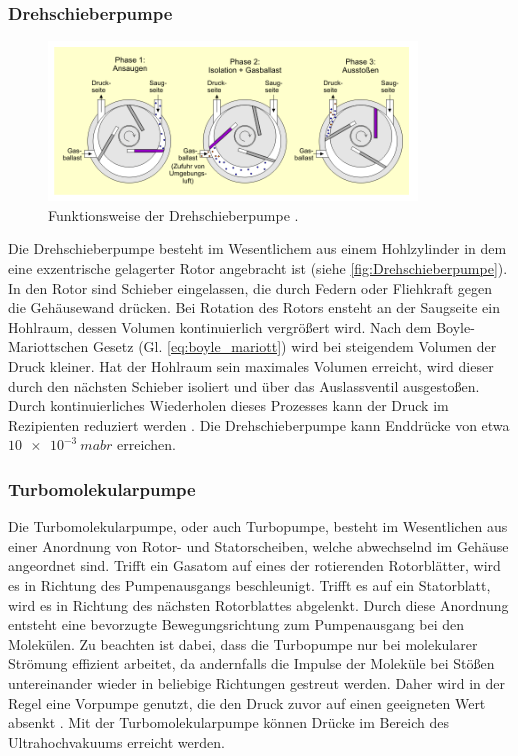 \subsubsection{Drehschieberpumpe}
\begin{figure}
    \centering
    \includegraphics{content/DP.PNG}
    \caption{Funktionsweise der Drehschieberpumpe \cite{V070_glossar}.}
    \label{fig:Drehschieberpumpe}
  \end{figure}
Die Drehschieberpumpe besteht im Wesentlichem aus einem Hohlzylinder in dem eine exzentrische gelagerter Rotor angebracht ist (siehe \autoref{fig:Drehschieberpumpe}).
In den Rotor sind Schieber eingelassen, die durch Federn oder Fliehkraft gegen die Gehäusewand drücken. Bei Rotation des Rotors ensteht an der Saugseite ein Hohlraum, dessen Volumen
kontinuierlich vergrößert wird. Nach dem Boyle-Mariottschen Gesetz (Gl. \eqref{eq:boyle_mariott}) wird bei steigendem Volumen der Druck kleiner. Hat der Hohlraum sein maximales
Volumen erreicht, wird dieser durch den nächsten Schieber isoliert und über das Auslassventil ausgestoßen. Durch kontinuierliches Wiederholen dieses Prozesses kann der Druck im
Rezipienten reduziert werden \cite{V070_glossar}. Die Drehschieberpumpe kann Enddrücke von etwa $\SI{10e-3}{mabr}$ erreichen.\cite{cern_vacuum}
\subsubsection{Turbomolekularpumpe}
Die Turbomolekularpumpe, oder auch Turbopumpe, besteht im Wesentlichen aus einer Anordnung von Rotor- und Statorscheiben, welche abwechselnd im Gehäuse angeordnet sind.
Trifft ein Gasatom auf eines der rotierenden Rotorblätter, wird es in Richtung des Pumpenausgangs beschleunigt. Trifft es auf ein Statorblatt, wird es in Richtung des nächsten Rotorblattes
abgelenkt. Durch diese Anordnung entsteht eine bevorzugte Bewegungsrichtung zum Pumpenausgang bei den Molekülen. Zu beachten ist dabei, dass die Turbopumpe nur bei molekularer
Strömung effizient arbeitet, da andernfalls die Impulse der Moleküle bei Stößen untereinander wieder in beliebige Richtungen gestreut werden. Daher wird in der Regel eine
Vorpumpe genutzt, die den Druck zuvor auf einen geeigneten Wert absenkt \cite{V070_glossar}. Mit der Turbomolekularpumpe können Drücke im Bereich des Ultrahochvakuums erreicht werden.\cite{cern_vacuum}

